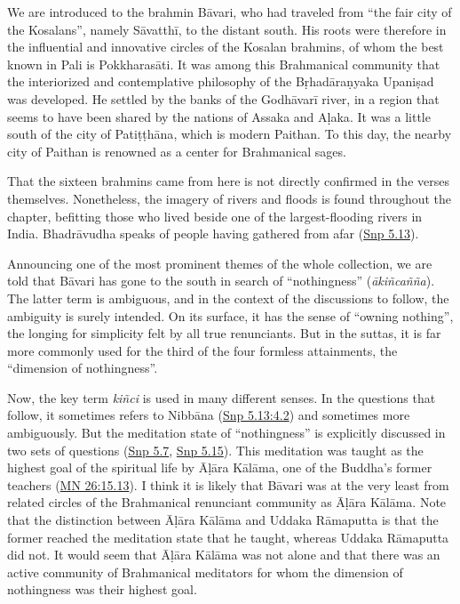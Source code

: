 \documentclass[12pt,openany]{book}%
\begin{document}
We are introduced to the brahmin \textsanskrit{Bāvari}, who had traveled from “the fair city of the Kosalans”, namely \textsanskrit{Sāvatthī}, to the distant south. His roots were therefore in the influential and innovative circles of the Kosalan brahmins, of whom the best known in Pali is \textsanskrit{Pokkharasāti}. It was among this Brahmanical community that the interiorized and contemplative philosophy of the \textsanskrit{Bṛhadāraṇyaka} \textsanskrit{Upaniṣad} was developed. He settled by the banks of the \textsanskrit{Godhāvarī} river, in a region that seems to have been shared by the nations of Assaka and \textsanskrit{Aḷaka}. It was a little south of the city of \textsanskrit{Patiṭṭhāna}, which is modern Paithan. To this day, the nearby city of Paithan is renowned as a center for Brahmanical sages.

That the sixteen brahmins came from here is not directly confirmed in the verses themselves. Nonetheless, the imagery of rivers and floods is found throughout the chapter, befitting those who lived beside one of the largest-flooding rivers in India. \textsanskrit{Bhadrāvudha} speaks of people having gathered from afar (\href{https://suttacentral.net/snp5.13/en/sujato}{Snp 5.13}).

Announcing one of the most prominent themes of the whole collection, we are told that \textsanskrit{Bāvari} has gone to the south in search of “nothingness” (\textit{\textsanskrit{ākiñcañña}}). The latter term is ambiguous, and in the context of the discussions to follow, the ambiguity is surely intended. On its surface, it has the sense of “owning nothing”, the longing for simplicity felt by all true renunciants. But in the suttas, it is far more commonly used for the third of the four formless attainments, the “dimension of nothingness”.

Now, the key term \textit{\textsanskrit{kiñci}} is used in many different senses. In the questions that follow, it sometimes refers to \textsanskrit{Nibbāna} (\href{https://suttacentral.net/snp5.13/en/sujato\#4.2}{Snp 5.13:4.2}) and sometimes more ambiguously. But the meditation state of “nothingness” is explicitly discussed in two sets of questions (\href{https://suttacentral.net/snp5.7/en/sujato}{Snp 5.7}, \href{https://suttacentral.net/snp5.15/en/sujato}{Snp 5.15}). This meditation was taught as the highest goal of the spiritual life by \textsanskrit{Āḷāra} \textsanskrit{Kālāma}, one of the Buddha’s former teachers (\href{https://suttacentral.net/mn26/en/sujato\#15.13}{MN 26:15.13}). I think it is likely that \textsanskrit{Bāvari} was at the very least from related circles of the Brahmanical renunciant community as \textsanskrit{Āḷāra} \textsanskrit{Kālāma}. Note that the distinction between \textsanskrit{Āḷāra} \textsanskrit{Kālāma} and Uddaka \textsanskrit{Rāmaputta} is that the former reached the meditation state that he taught, whereas Uddaka \textsanskrit{Rāmaputta} did not. It would seem that \textsanskrit{Āḷāra} \textsanskrit{Kālāma} was not alone and that there was an active community of Brahmanical meditators for whom the dimension of nothingness was their highest goal.
\end{document}
